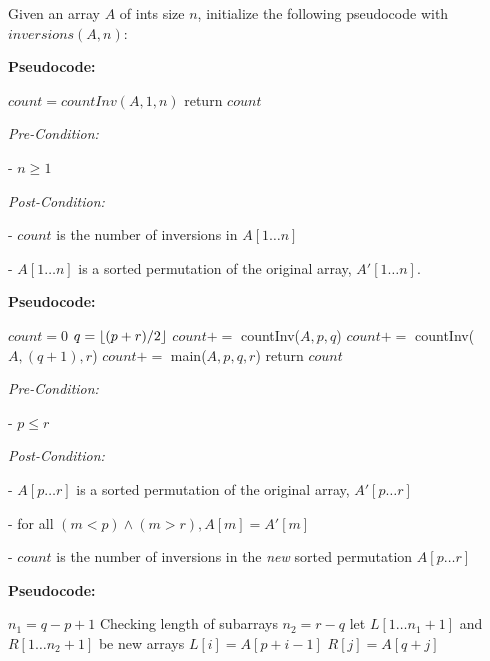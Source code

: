 \documentclass[a4paper]{report}
\DeclarePairedDelimiter{\floor}{\lfloor}{\rfloor}
\begin{document}
\begin{enumerate}
      Given an array $A$ of ints size $n$, initialize the following pseudocode with $inversions(A, n)$: 

      {\bf Pseudocode:}
      \begin{algorithmic}[1]
          \State $count = countInv(A, 1, n)$
          \State return $count$
        \EndFunction
      \end{algorithmic}

      {\it Pre-Condition:}

       - $n \geq 1$

      {\it Post-Condition:}

        - $count$ is the number of inversions in  $A[1 \dots n]$

        - $A[1\dots n]$ is a sorted permutation of the original array, $A'[1\dots n]$.

      {\bf Pseudocode:}
      \begin{algorithmic}[1]
          \State $count = 0$
            \State $q = \floor{(p+r) / 2}$
            \State $count +=$ countInv($A, p, q$)
            \State $count +=$ countInv($A, (q+1), r$)
            \State $count +=$ main($A, p, q, r$)
          \EndIf
          \State return $count$
        \EndFunction
      \end{algorithmic}

      {\it Pre-Condition:}

       - $p \leq r$

      {\it Post-Condition:}

        - $A[p\dots r]$ is a sorted permutation of the original array, $A'[p \dots r]$

        - for all $(m < p) \wedge (m > r), A[m] = A'[m]$

        - $count$ is the number of inversions in the {\it new} sorted permutation $A[p \dots r]$

      



      {\bf Pseudocode:}
      \begin{algorithmic}[1]
          \State $n_{1} = q - p + 1$
          \Comment Checking length of subarrays
          \State $n_{2} = r - q$
          \State let $L[1\dots n_{1} + 1]$ and $R[1\dots n_2 + 1]$ be new arrays
            \State $L[i]  = A[p + i - 1]$
          \EndFor
            \State $R[j] = A[q + j]$
          \EndFor


\end{algorithmic}
\end{enumerate}
\end{document}
